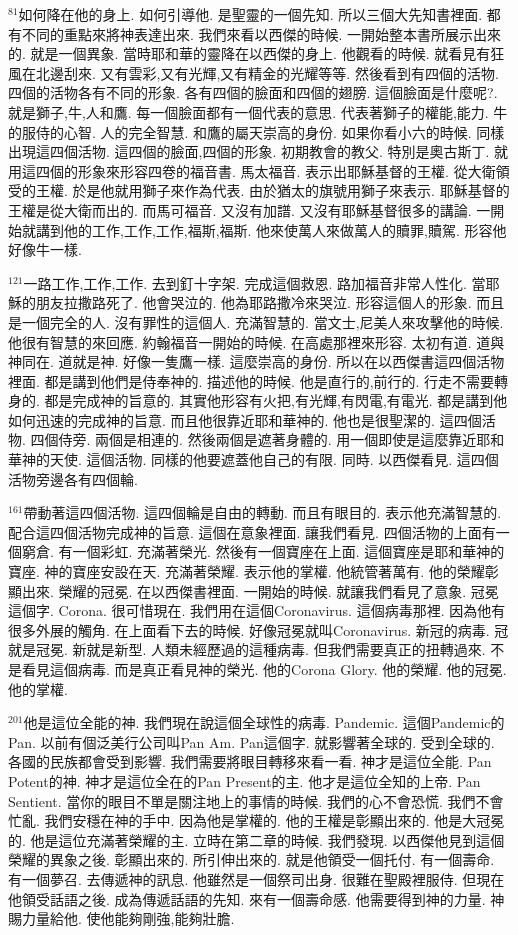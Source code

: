\documentclass{book}
\begin{document}
$^{81}$如何降在他的身上.
如何引導他.
是聖靈的一個先知.
所以三個大先知書裡面.
都有不同的重點來將神表達出來.
我們來看以西傑的時候.
一開始整本書所展示出來的.
就是一個異象.
當時耶和華的靈降在以西傑的身上.
他觀看的時候.
就看見有狂風在北邊刮來.
又有雲彩,又有光輝,又有精金的光耀等等.
然後看到有四個的活物.
四個的活物各有不同的形象.
各有四個的臉面和四個的翅膀.
這個臉面是什麼呢?.
就是獅子,牛,人和鷹.
每一個臉面都有一個代表的意思.
代表著獅子的權能,能力.
牛的服侍的心智.
人的完全智慧.
和鷹的屬天崇高的身份.
如果你看小六的時候.
同樣出現這四個活物.
這四個的臉面,四個的形象.
初期教會的教父.
特別是奧古斯丁.
就用這四個的形象來形容四卷的福音書.
馬太福音.
表示出耶穌基督的王權.
從大衛領受的王權.
於是他就用獅子來作為代表.
由於猶太的旗號用獅子來表示.
耶穌基督的王權是從大衛而出的.
而馬可福音.
又沒有加譜.
又沒有耶穌基督很多的講論.
一開始就講到他的工作,工作,工作,福斯,福斯.
他來使萬人來做萬人的贖罪,贖駕.
形容他好像牛一樣.

$^{121}$一路工作,工作,工作.
去到釘十字架.
完成這個救恩.
路加福音非常人性化.
當耶穌的朋友拉撒路死了.
他會哭泣的.
他為耶路撒冷來哭泣.
形容這個人的形象.
而且是一個完全的人.
沒有罪性的這個人.
充滿智慧的.
當文士,尼美人來攻擊他的時候.
他很有智慧的來回應.
約翰福音一開始的時候.
在高處那裡來形容.
太初有道.
道與神同在.
道就是神.
好像一隻鷹一樣.
這麼崇高的身份.
所以在以西傑書這四個活物裡面.
都是講到他們是侍奉神的.
描述他的時候.
他是直行的,前行的.
行走不需要轉身的.
都是完成神的旨意的.
其實他形容有火把,有光輝,有閃電,有電光.
都是講到他如何迅速的完成神的旨意.
而且他很靠近耶和華神的.
他也是很聖潔的.
這四個活物.
四個侍旁.
兩個是相連的.
然後兩個是遮著身體的.
用一個即使是這麼靠近耶和華神的天使.
這個活物.
同樣的他要遮蓋他自己的有限.
同時.
以西傑看見.
這四個活物旁邊各有四個輪.

$^{161}$帶動著這四個活物.
這四個輪是自由的轉動.
而且有眼目的.
表示他充滿智慧的.
配合這四個活物完成神的旨意.
這個在意象裡面.
讓我們看見.
四個活物的上面有一個窮倉.
有一個彩虹.
充滿著榮光.
然後有一個寶座在上面.
這個寶座是耶和華神的寶座.
神的寶座安設在天.
充滿著榮耀.
表示他的掌權.
他統管著萬有.
他的榮耀彰顯出來.
榮耀的冠冕.
在以西傑書裡面.
一開始的時候.
就讓我們看見了意象.
冠冕這個字.
Corona.
很可惜現在.
我們用在這個Coronavirus.
這個病毒那裡.
因為他有很多外展的觸角.
在上面看下去的時候.
好像冠冕就叫Coronavirus.
新冠的病毒.
冠就是冠冕.
新就是新型.
人類未經歷過的這種病毒.
但我們需要真正的扭轉過來.
不是看見這個病毒.
而是真正看見神的榮光.
他的Corona Glory.
他的榮耀.
他的冠冕.
他的掌權.

$^{201}$他是這位全能的神.
我們現在說這個全球性的病毒.
Pandemic.
這個Pandemic的Pan.
以前有個泛美行公司叫Pan Am.
Pan這個字.
就影響著全球的.
受到全球的.
各國的民族都會受到影響.
我們需要將眼目轉移來看一看.
神才是這位全能.
Pan Potent的神.
神才是這位全在的Pan Present的主.
他才是這位全知的上帝.
Pan Sentient.
當你的眼目不單是關注地上的事情的時候.
我們的心不會恐慌.
我們不會忙亂.
我們安穩在神的手中.
因為他是掌權的.
他的王權是彰顯出來的.
他是大冠冕的.
他是這位充滿著榮耀的主.
立時在第二章的時候.
我們發現.
以西傑他見到這個榮耀的異象之後.
彰顯出來的.
所引伸出來的.
就是他領受一個托付.
有一個壽命.
有一個夢召.
去傳遞神的訊息.
他雖然是一個祭司出身.
很難在聖殿裡服侍.
但現在他領受話語之後.
成為傳遞話語的先知.
來有一個壽命感.
他需要得到神的力量.
神賜力量給他.
使他能夠剛強,能夠壯膽.
\end{document}
